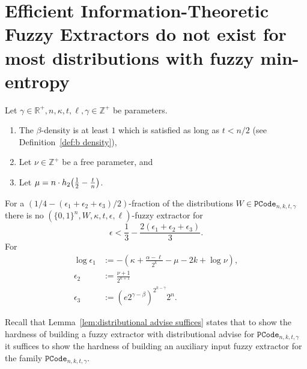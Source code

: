

\section{Efficient Information-Theoretic Fuzzy Extractors do not exist for most distributions with fuzzy min-entropy}
\label{sec:fe}


\begin{theorem}
Let $\gamma \in\mathbb{R}^+, n, \kappa, t, \ell, \gamma \in\mathbb{Z}^+$ be parameters. 
\begin{enumerate}
\itemsep0em
\item The $\beta$-density is at least $1$ which is  satisfied as long as $t< n/2 $ (see Definition~\ref{def:b density}),
\item Let $\nu \in \mathbb{Z}^+$ be a free parameter, and
\item Let $\mu =  n \cdot h_2\!\left(\frac{1}{2} - \frac{t}{n}\right)$.
\end{enumerate}
For a $(1/4-(\epsilon_1+\epsilon_2+\epsilon_3)/2)$-fraction of the distributions $W\in \mathtt{PCode}_{n, k, t, \gamma}$ there is no $(\{0,1\}^n, W, \kappa, t, \epsilon, \ell)$-fuzzy extractor for 
\[
\epsilon< \frac{1}{3} - \frac{2(\epsilon_1+\epsilon_2+\epsilon_3)}{3}.
\]
For 
\begin{align*}\log{\epsilon_1}&:= -\left(\kappa+\frac{\alpha -\ell}{2^k} - \mu -2k+\log{\nu}\right),\\
\epsilon_2&:=\frac{\nu+1}{2^{\kappa+1}}\\
\epsilon_3&:=\left(e2^{\gamma-\beta}\right)^{2^{k-\gamma}}2^n.
\end{align*}
\label{thm:main theorem}
\end{theorem}

Recall that Lemma~\ref{lem:distributional advise suffices} states that to show the hardness of building a fuzzy extractor with distributional advise for $\mathtt{PCode}_{n, k, t, \gamma}$ it suffices to show the hardness of building an auxiliary input fuzzy extractor for the family $\mathtt{PCode}_{n, k, t, \gamma}$. 


